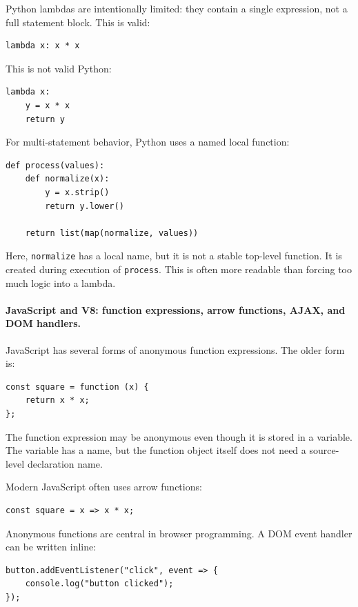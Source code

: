 Python lambdas are intentionally limited: they contain a single expression, not a full statement block. This is valid:

\begin{verbatim}
lambda x: x * x
\end{verbatim}

This is not valid Python:

\begin{verbatim}
lambda x:
    y = x * x
    return y
\end{verbatim}

For multi-statement behavior, Python uses a named local function:

\begin{verbatim}
def process(values):
    def normalize(x):
        y = x.strip()
        return y.lower()

    return list(map(normalize, values))
\end{verbatim}

Here, \texttt{normalize} has a local name, but it is not a stable top-level function. It is created during execution of \texttt{process}. This is often more readable than forcing too much logic into a lambda.

\paragraph{JavaScript and V8: function expressions, arrow functions, AJAX, and DOM handlers.}

JavaScript has several forms of anonymous function expressions. The older form is:

\begin{verbatim}
const square = function (x) {
    return x * x;
};
\end{verbatim}

The function expression may be anonymous even though it is stored in a variable. The variable has a name, but the function object itself does not need a source-level declaration name.

Modern JavaScript often uses arrow functions:

\begin{verbatim}
const square = x => x * x;
\end{verbatim}

Anonymous functions are central in browser programming. A DOM event handler can be written inline:

\begin{verbatim}
button.addEventListener("click", event => {
    console.log("button clicked");
});
\end{verbatim}

